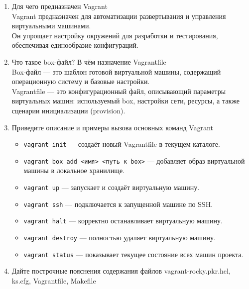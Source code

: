 \begin{enumerate}
\def\labelenumi{\arabic{enumi}.}
\item
  Для чего предназначен Vagrant\\
  Vagrant предназначен для автоматизации развертывания и управления
  виртуальными машинами.\\
  Он упрощает настройку окружений для разработки и тестирования,
  обеспечивая единообразие конфигураций.
\item
  Что такое box-файл? В чём назначение Vagrantfile\\
  Box-файл --- это шаблон готовой виртуальной машины, содержащий
  операционную систему и базовые настройки.\\
  Vagrantfile --- это конфигурационный файл, описывающий параметры
  виртуальных машин: используемый box, настройки сети, ресурсы, а также
  сценарии инициализации (provision).
\item
  Приведите описание и примеры вызова основных команд Vagrant

  \begin{itemize}
  \tightlist
  \item
    \texttt{vagrant\ init} --- создаёт новый Vagrantfile в текущем
    каталоге.\\
  \item
    \texttt{vagrant\ box\ add\ \textless{}имя\textgreater{}\ \textless{}путь\ к\ box\textgreater{}}
    --- добавляет образ виртуальной машины в локальное хранилище.\\
  \item
    \texttt{vagrant\ up} --- запускает и создаёт виртуальную машину.\\
  \item
    \texttt{vagrant\ ssh} --- подключается к запущенной машине по SSH.\\
  \item
    \texttt{vagrant\ halt} --- корректно останавливает виртуальную
    машину.\\
  \item
    \texttt{vagrant\ destroy} --- полностью удаляет виртуальную
    машину.\\
  \item
    \texttt{vagrant\ status} --- показывает текущее состояние всех машин
    проекта.
  \end{itemize}
\item
  Дайте построчные пояснения содержания файлов vagrant-rocky.pkr.hcl,
  ks.cfg, Vagrantfile, Makefile


\end{enumerate}
